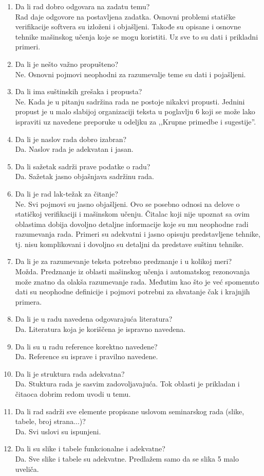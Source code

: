 \documentclass[a4paper]{report}
\begin{document}
\begin{enumerate}
\item Da li rad dobro odgovara na zadatu temu?\\
Rad daje odgovore na postavljena zadatka. Osnovni problemi statičke verifikacije softvera su izloženi i objašljeni. Takođe su opisane i  osnovne tehnike mašinskog učenja koje se mogu koristiti. Uz sve to su dati i prikladni primeri.
\item Da li je nešto važno propušteno?\\
Ne. Osnovni pojmovi neophodni za razumevalje teme su dati i pojašljeni.
\item Da li ima suštinskih grešaka i propusta?\\
Ne. Kada je u pitanju sadržina rada ne postoje nikakvi propusti. Jednini propust je u malo slabijoj organizaciji teksta u poglavlju 6 koji se može lako ispraviti uz navedene preporuke u odeljku za ,,Krupne primedbe i sugestije''.
\item Da li je naslov rada dobro izabran?\\
Da. Naslov rada je adekvatan i jasan.
\item Da li sažetak sadrži prave podatke o radu?\\
Da. Sažetak jasno objašnjava sadržinu rada.
\item Da li je rad lak-težak za čitanje?\\
Ne. Svi pojmovi su jasno objašljeni. Ovo se posebno odnosi na delove o statičkoj verifikaciji i mašinskom učenju. Čitalac koji nije upoznat sa ovim oblastima dobija dovoljno detaljne informacije koje su mu neophodne radi razumevanja rada. Primeri su adekvatni i jasno opisuju predstavljene tehnike, tj. nisu komplikovani i dovoljno su detaljni da predstave suštinu tehnike.
\item Da li je za razumevanje teksta potrebno predznanje i u kolikoj meri?\\
Možda. Predznanje iz oblasti mašinskog učenja i automatskog rezonovanja može znatno da olakša razumevanje rada. Međutim kao što je već spomenuto dati su neophodne definicije i pojmovi potrebni za shvatanje čak i krajnjih primera.
\item Da li je u radu navedena odgovarajuća literatura?\\
Da. Literatura koja je koriščena je ispravno navedena.
\item Da li su u radu reference korektno navedene?\\
Da. Reference su isprave i pravilno navedene.
\item Da li je struktura rada adekvatna?\\
Da. Stuktura rada je sasvim zadovoljavajuća. Tok oblasti je prikladan i čitaoca dobrim redom uvodi u temu.
\item Da li rad sadrži sve elemente propisane uslovom seminarskog rada (slike, tabele, broj strana...)?\\
Da. Svi uslovi su ispunjeni.
\item Da li su slike i tabele funkcionalne i adekvatne?\\
Da. Sve slike i tabele su adekvatne. Predlažem samo da se slika 5 malo uveliča.	
\end{enumerate}
\end{document}
